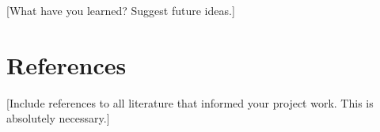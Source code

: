 \documentclass{article} %
\begin{document}
[What have you learned? Suggest future ideas.]

\section{References}

[Include references to all literature that informed your project work. This is absolutely necessary.]

\end{document}
